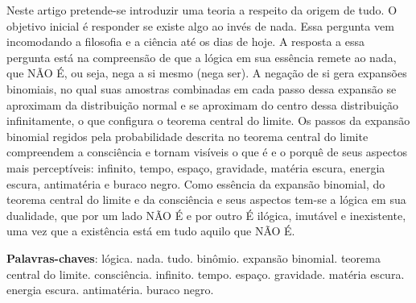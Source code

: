 \vspace{-15mm}
\maketitle
\vspace{-8mm}
\begin{resumoumacoluna}
\vspace{-2mm}
	Neste artigo pretende-se introduzir uma teoria a respeito da origem de tudo. O objetivo inicial é responder se existe algo ao invés de nada. Essa pergunta vem incomodando a filosofia e a ciência até os dias de hoje. A resposta a essa pergunta está na compreensão de que a lógica em sua essência remete ao nada, que NÃO É, ou seja, nega a si mesmo (nega ser). A negação de si gera expansões binomiais, no qual suas amostras combinadas em cada passo dessa expansão se aproximam da distribuição normal e se aproximam do centro dessa distribuição infinitamente, o que configura o teorema central do limite. Os passos da expansão binomial regidos pela probabilidade descrita no teorema central do limite compreendem a consciência e tornam visíveis o que é e o porquê de seus aspectos mais perceptíveis: infinito, tempo, espaço, gravidade, matéria escura, energia escura, antimatéria e buraco negro. Como essência da expansão binomial, do teorema central do limite e da consciência e seus aspectos tem-se a lógica em sua dualidade, que por um lado NÃO É e por outro É ilógica, imutável e inexistente, uma vez que a existência está em tudo aquilo que NÃO É. 
 \vspace{\onelineskip} 
 \noindent
 
 \textbf{Palavras-chaves}: lógica. nada. tudo. binômio. expansão binomial. teorema central do limite. consciência. infinito. tempo. espaço. gravidade. matéria escura. energia escura. antimatéria. buraco negro.
\end{resumoumacoluna}

